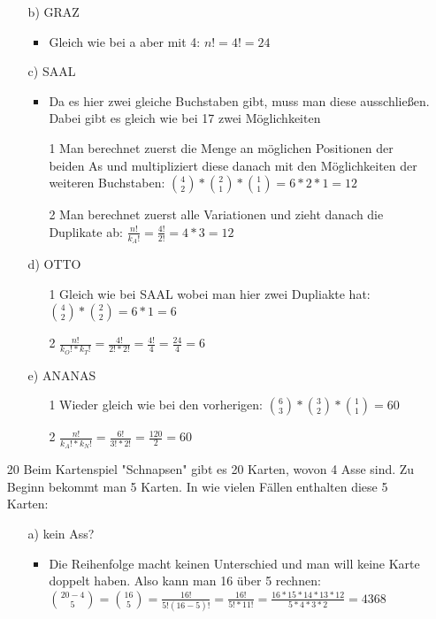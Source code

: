 \documentclass{article}
\begin{document}
\begin{itemize}
\begin{itemize}
			\item[b)]{GRAZ}
			\begin{itemize}
				\item{Gleich wie bei a aber mit 4: $n!=4!=24$}
			\end{itemize}
			\item[c)]{SAAL}
			\begin{itemize}
				\item{Da es hier zwei gleiche Buchstaben gibt, muss man diese ausschließen. Dabei gibt es gleich wie bei 17 zwei Möglichkeiten}
				\item[1]{Man berechnet zuerst die Menge an möglichen Positionen der beiden As und multipliziert diese danach mit den Möglichkeiten der weiteren Buchstaben: $\binom{4}{2}*\binom{2}{1}*\binom{1}{1}=6*2*1=12$}
				\item[2]{Man berechnet zuerst alle Variationen und zieht danach die Duplikate ab: $\frac{n!}{k_A!}=\frac{4!}{2!}=4*3=12$}
			\end{itemize}
			\item[d)]{OTTO}
			\begin{itemize}
				\item[1]{Gleich wie bei SAAL wobei man hier zwei Dupliakte hat: $\binom{4}{2}*\binom{2}{2}=6*1=6$}
				\item[2]{$\frac{n!}{k_O!*k_T!}=\frac{4!}{2!*2!}=\frac{4!}{4}=\frac{24}{4}=6$}
			\end{itemize}
			\item[e)]{ANANAS}
			\begin{itemize}
				\item[1]{Wieder gleich wie bei den vorherigen: $\binom{6}{3}*\binom{3}{2}*\binom{1}{1}=60$}
				\item[2]{$\frac{n!}{k_A!*k_N!}=\frac{6!}{3!*2!}=\frac{120}{2}=60$}
			\end{itemize}
		\end{itemize}
		\item[20]{Beim Kartenspiel "Schnapsen" gibt es 20 Karten, wovon 4 Asse sind. Zu Beginn bekommt man 5 Karten. In wie vielen Fällen enthalten diese 5 Karten:}
		\begin{itemize}
			\item[a)]{kein Ass?}
			\begin{itemize}
				\item{Die Reihenfolge macht keinen Unterschied und man will keine Karte doppelt haben. Also kann man 16 über 5 rechnen: $\binom{20-4}{5}=\binom{16}{5}=\frac{16!}{5!(16-5)!}=\frac{16!}{5!*11!}=\frac{16*15*14*13*12}{5*4*3*2}=4368$}

\end{itemize}
\end{itemize}
\end{itemize}
\end{document}

